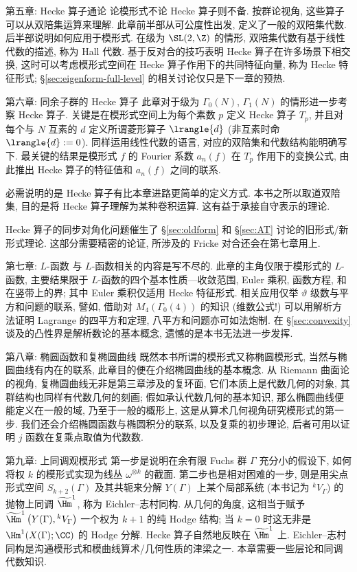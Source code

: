 \begin{asparadesc}
	\item[第五章: Hecke 算子通论] 论模形式不论 Hecke 算子则不备. 按群论视角, 这些算子可以从双陪集运算来理解. 此章前半部从可公度性出发, 定义了一般的双陪集代数. 后半部说明如何应用于模形式. 在级为 $\SL(2, \Z)$ 的情形, 双陪集代数有基于线性代数的描述, 称为 Hall 代数. 基于反对合的技巧表明 Hecke 算子在许多场景下相交换, 这时可以考虑模形式空间在 Hecke 算子作用下的共同特征向量, 称为 Hecke 特征形式; \S\ref{sec:eigenform-full-level} 的相关讨论仅只是下一章的预热.

	\item[第六章: 同余子群的 Hecke 算子] 此章对于级为 $\Gamma_0(N)$, $\Gamma_1(N)$ 的情形进一步考察 Hecke 算子. 关键是在模形式空间上为每个素数 $p$ 定义 Hecke 算子 $T_p$, 并且对每个与 $N$ 互素的 $d$ 定义所谓菱形算子 $\lrangle{d}$ (非互素时命 $\lrangle{d} := 0$). 同样运用线性代数的语言, 对应的双陪集和代数结构能明确写下. 最关键的结果是模形式 $f$ 的 Fourier 系数 $a_n(f)$ 在 $T_p$ 作用下的变换公式, 由此推出 Hecke 算子的特征值和 $a_n(f)$ 之间的联系.
	
	必需说明的是 Hecke 算子有比本章进路更简单的定义方式. 本书之所以取道双陪集, 目的是将 Hecke 算子理解为某种卷积运算. 这有益于承接自守表示的理论.
	
	Hecke 算子的同步对角化问题催生了 \S\ref{sec:oldform} 和 \S\ref{sec:AT} 讨论的旧形式/新形式理论. 这部分需要精密的论证, 所涉及的 Fricke 对合还会在第七章用上.

	\item[第七章: $L$-函数] 与 $L$-函数相关的内容是写不尽的. 此章的主角仅限于模形式的 $L$-函数, 主要结果限于 $L$-函数的四个基本性质---收敛范围, Euler 乘积, 函数方程, 和在竖带上的界; 其中 Euler 乘积仅适用 Hecke 特征形式. 相关应用仅举 $\vartheta$ 级数与平方和问题的联系, 譬如, 借助对 $M_4(\Gamma_0(4))$ 的知识 (维数公式!) 可以用解析方法证明 Lagrange 的四平方和定理, 八平方和问题亦可如法炮制. 在 \S\ref{sec:convexity} 谈及的凸性界是解析数论的基本概念, 遗憾的是本书无法进一步发挥.

	\item[第八章: 椭圆函数和复椭圆曲线] 既然本书所谓的模形式又称椭圆模形式, 当然与椭圆曲线有内在的联系, 此章目的便在介绍椭圆曲线的基本概念. 从 Riemann 曲面论的视角, 复椭圆曲线无非是第三章涉及的复环面, 它们本质上是代数几何的对象, 其群结构也同样有代数几何的刻画; 假如承认代数几何的基本知识, 那么椭圆曲线便能定义在一般的域, 乃至于一般的概形上, 这是从算术几何视角研究模形式的第一步. 我们还会介绍椭圆函数与椭圆积分的联系, 以及复乘的初步理论, 后者可用以证明 $j$ 函数在复乘点取值为代数数.

	\item[第九章: 上同调观模形式] 第一步是说明在余有限 Fuchs 群 $\Gamma$ 充分小的假设下, 如何将权 $k$ 的模形式实现为线丛 $\omega^{\otimes k}$ 的截面. 第二步也是相对困难的一步, 则是用尖点形式空间 $S_{k+2}(\Gamma)$ 及其共轭来分解 $Y(\Gamma)$ 上某个局部系统 (本书记为 ${}^k V_\Gamma$) 的抛物上同调 $\widetilde{\Hm}^1$, 称为 Eichler--志村同构. 从几何的角度, 这相当于赋予 $\widetilde{\Hm}^1\left(Y(\Gamma), {}^k V_\Gamma\right)$ 一个权为 $k+1$ 的纯 Hodge 结构; 当 $k=0$ 时这无非是 $\Hm^1(X(\Gamma); \CC)$ 的 Hodge 分解. Hecke 算子自然地反映在 $\widetilde{\Hm}^1$ 上. Eichler--志村同构是沟通模形式和模曲线算术/几何性质的津梁之一. 本章需要一些层论和同调代数知识.


\end{asparadesc}
